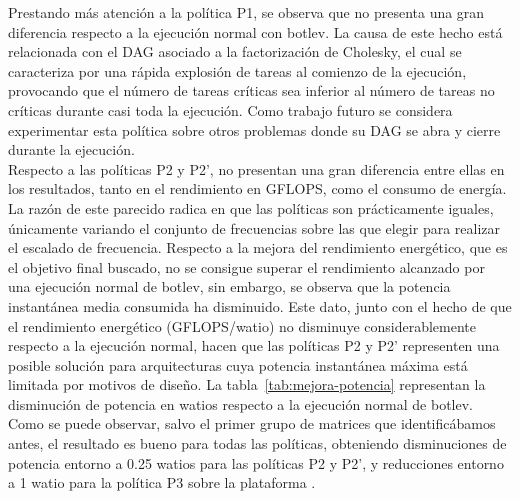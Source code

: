 Prestando más atención a la política P1, se observa que no presenta una
gran diferencia respecto a la ejecución normal con botlev. La causa de este
hecho está relacionada con el DAG asociado a la factorización de Cholesky,
el cual se caracteriza por una rápida explosión de tareas al comienzo de la
ejecución, provocando que el número de tareas críticas sea inferior al
número de tareas no críticas durante casi toda la ejecución. Como trabajo
futuro se considera experimentar esta política sobre otros problemas donde
su DAG se abra y cierre durante la ejecución.\\
Respecto a las políticas P2 y P2', no presentan una gran diferencia entre
ellas en los resultados, tanto en el rendimiento en GFLOPS, como el consumo
de energía. La razón de este parecido radica en que las políticas son
prácticamente iguales, únicamente variando el conjunto de frecuencias sobre
las que elegir para realizar el escalado de frecuencia. Respecto a la
mejora del rendimiento energético, que es el objetivo final buscado, no se
consigue superar el rendimiento alcanzado por una ejecución normal de
botlev, sin embargo, se observa que la potencia instantánea media consumida
ha disminuido. Este dato, junto con el hecho de que el rendimiento
energético (GFLOPS/watio) no disminuye considerablemente respecto a la
ejecución normal, hacen que las políticas P2 y P2' representen una posible
solución para arquitecturas cuya potencia instantánea máxima está limitada
por motivos de diseño. La tabla~\ref{tab:mejora-potencia} representan la
disminución de potencia en watios respecto a la ejecución normal de
botlev. Como se puede observar, salvo el primer grupo de matrices que
identificábamos antes, el resultado es bueno para todas las políticas,
obteniendo disminuciones de potencia entorno a 0.25 watios para las
políticas P2 y P2', y reducciones entorno a 1 watio para la política P3
sobre la plataforma \juno.

